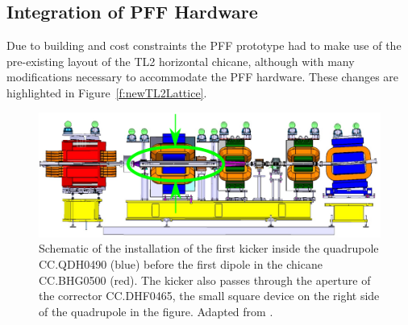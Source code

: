 \subsection{Integration of PFF Hardware}
\label{ss:tl2PFFIntegration}

Due to building and cost constraints the PFF prototype had to make use of the pre-existing layout of the TL2 horizontal chicane, although with many modifications necessary to accommodate the PFF hardware. These changes are highlighted in Figure~\ref{f:newTL2Lattice}.

\begin{figure}
  \centering
  \includegraphics[width=\textwidth]{Figures/optics/kickerInsideQuad}
  \caption{Schematic of the installation of the first kicker inside the quadrupole CC.QDH0490 (blue) before the first dipole in the chicane CC.BHG0500 (red). The kicker also passes through the aperture of the corrector CC.DHF0465, the small square device on the right side of the quadrupole in the figure. Adapted from \cite{kickInQuad}.}
  \label{f:kickerInsideQuad}
\end{figure}

